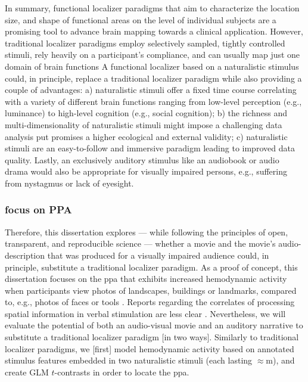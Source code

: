In summary, functional localizer paradigms that aim to characterize the location
size, and shape of functional areas on the level of individual subjects are a
promising tool to advance brain mapping towards a clinical application.
However, traditional localizer paradigms employ selectively sampled, tightly
controlled stimuli, rely heavily on a participant's compliance, and can usually
map just one domain of brain functions
A functional localizer based on a naturalistic stimulus could, in principle,
replace a traditional localizer paradigm while also providing a couple of
advantages:
a) naturalistic stimuli offer a fixed time course correlating with a variety of
different brain functions ranging from low-level perception (e.g., luminance) to
high-level cognition (e.g., social cognition);
b) the richness and multi-dimensionality of naturalistic stimuli might impose a
challenging data analysis put promises a higher ecological and external
validity;
c) naturalistic stimuli are an easy-to-follow and immersive paradigm leading to
improved data quality.
Lastly, an exclusively auditory stimulus like an audiobook or audio drama would
also be appropriate for visually impaired persons, e.g., suffering from
nystagmus or lack of eyesight.

\subsubsection{focus on PPA}


Therefore, this dissertation explores --- while following the principles of
open, transparent, and reproducible science --- whether a movie and the movie's
audio-description that was produced for a visually impaired audience could, in
principle, substitute a traditional localizer paradigm.
As a proof of concept, this dissertation focuses on the \ac{ppa} that exhibits
increased hemodynamic activity when participants view photos of landscapes,
buildings or landmarks, compared to, e.g., photos of faces or tools
\citep[e.g.,][for reviews]{epstein2014neural, aminoff2013role}.
Reports regarding the correlates of processing spatial information in verbal
stimulation are less clear \citep{aziz2008modulation}.
%
Nevertheless, we will evaluate the potential of both an audio-visual movie and
an auditory narrative to substitute a traditional localizer paradigm [in two
ways].
Similarly to traditional localizer paradigms, we [first] model hemodynamic
activity based on annotated stimulus features embedded in two naturalistic
stimuli (each lasting $\approx$\unit[120]{m}), and create GLM $t$-contrasts in
order to locate the \ac{ppa}.


